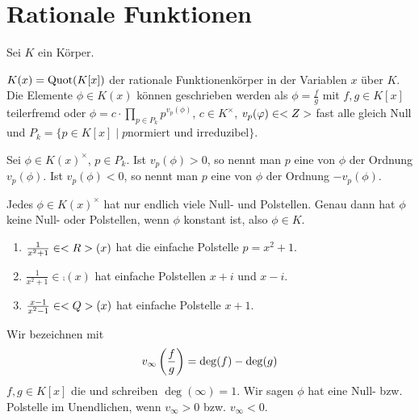 \section{Rationale Funktionen}

Sei $K$ ein Körper.

\begin{erinnerung}
	$K(x) = \operatorname{Quot}(K[x])$ der rationale Funktionenkörper in der Variablen $x$ über $K$. Die Elemente $\phi\in K(x)$ können geschrieben werden als $\phi = \frac{f}{g}$ mit $f,g\in K[x]$ teilerfremd oder $\phi = c\cdot\prod_{p\in P_k} p^{v_p(\phi)}$, $c\in K^\times$, $v_p(\varphi)\in<Z>$ fast alle gleich Null und $P_k = \{p\in K[x]\mid p\text{normiert und irreduzibel}\}$.
\end{erinnerung}

\begin{definition}
	Sei $\phi\in K(x)^\times$, $p\in P_k$. Ist $v_p(\phi)>0$, so nennt man $p$ eine  von $\phi$ der Ordnung $v_p(\phi)$. Ist $v_p(\phi)<0$, so nennt man $p$ eine  von $\phi$ der Ordnung $-v_p(\phi)$.
\end{definition}

\begin{remark}
	Jedes $\phi\in K(x)^\times$ hat nur endlich viele Null- und Polstellen. Genau dann hat $\phi$ keine Null- oder Polstellen, wenn $\phi$ konstant ist, also $\phi\in K$.
\end{remark}

\begin{example}
	\begin{enumerate}[label=(\alph*)]
		\item $\frac{1}{x^2+1}\in<R>(x)$ hat die einfache Polstelle $p=x^2+1$.
		\item $\frac{1}{x^2+1}\in\comp(x)$ hat einfache Polstellen $x+i$ und $x-i$.
		\item $\frac{x-1}{x^2-1}\in<Q>(x)$ hat einfache Polstelle $x+1$.
	\end{enumerate}
\end{example}

\begin{definition}
	Wir bezeichnen mit
	\begin{align}
		v_\infty\left(\frac{f}{g}\right) = \deg(f)-\deg(g)\notag
	\end{align}
	$f,g\in K[x]$ die  und schreiben $\deg(\infty)=1$. Wir sagen $\phi$ hat eine Null- bzw. Polstelle im Unendlichen, wenn $v_\infty>0$ bzw. $v_\infty<0$.
\end{definition}

